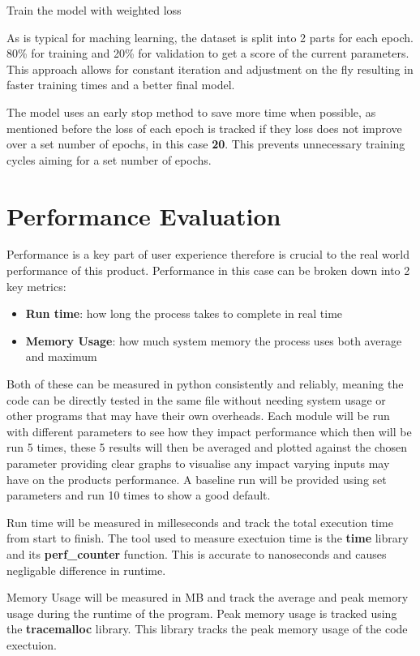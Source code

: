\documentclass[final]{cmpreport_02}
\begin{document}
Train the model with weighted loss


As is typical for maching learning, the dataset is split into 2 parts for each epoch. 80\% for training and 20\% for validation to get a score of the current parameters.
This approach allows for constant iteration and adjustment on the fly resulting in faster training times and a better final model.

The model uses an early stop method to save more time when possible, as mentioned before the loss of each epoch is tracked if they loss does not improve over a set number of epochs, in this case \textbf{20}.
This prevents unnecessary training cycles aiming for a set number of epochs.


\section{Performance Evaluation}

Performance is a key part of user experience therefore is crucial to the real world performance of this product.
Performance in this case can be broken down into 2 key metrics:

\begin{itemize}
	\item{\textbf{Run time}: how long the process takes to complete in real time}
	\item{\textbf{Memory Usage}: how much system memory the process uses both average and maximum}
\end{itemize}

Both of these can be measured in python consistently and reliably, meaning the code can be directly tested in the same file without needing system usage or other programs that may have their own overheads.
Each module will be run with different parameters to see how they impact performance which then will be run 5 times,
these 5 results will then be averaged and plotted against the chosen parameter providing clear graphs to visualise any impact varying inputs may have on the products performance.
A baseline run will be provided using set parameters and run 10 times to show a good default.

Run time will be measured in milleseconds and track the total execution time from start to finish.
The tool used to measure exectuion time  is the \textbf{time} library and its \textbf{perf\_counter} function.
This is accurate to nanoseconds and causes negligable difference in runtime.

Memory Usage will be measured in MB and track the average and peak memory usage during the runtime of the program.
Peak memory usage is tracked using the \textbf{tracemalloc} library.
This library tracks the peak memory usage of the code exectuion.
\end{document}
